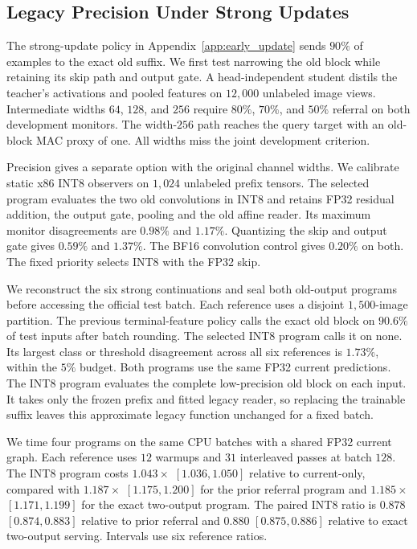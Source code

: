 \subsection{Legacy Precision Under Strong Updates}\label{app:legacy_precision}

The strong-update policy in Appendix~\ref{app:early_update} sends
$90\%$ of examples to the exact old suffix. We first test narrowing
the old block while retaining its skip path and output gate. A
head-independent student distils the teacher's activations and pooled
features on $12{,}000$ unlabeled image views. Intermediate widths
$64$, $128$, and $256$ require $80\%$, $70\%$, and $50\%$ referral on
both development monitors. The width-$256$ path reaches the query
target with an old-block MAC proxy of one. All widths miss the joint
development criterion.

Precision gives a separate option with the original channel widths.
We calibrate static x86 INT8 observers on $1{,}024$ unlabeled prefix
tensors. The selected program evaluates the two old convolutions in
INT8 and retains FP32 residual addition, the output gate, pooling and
the old affine reader. Its maximum monitor disagreements are $0.98\%$
and $1.17\%$. Quantizing the skip and output gate gives $0.59\%$ and
$1.37\%$. The BF16 convolution control gives $0.20\%$ on both.
The fixed priority selects INT8 with the FP32 skip.

We reconstruct the six strong continuations and seal both old-output
programs before accessing the official test batch. Each reference
uses a disjoint $1{,}500$-image partition. The previous terminal-feature
policy calls the exact old block on $90.6\%$ of test inputs after batch
rounding. The selected INT8 program calls it on none. Its largest
class or threshold disagreement across all six references is
$1.73\%$, within the $5\%$ budget. Both programs use the same FP32
current predictions. The INT8 program evaluates the complete
low-precision old block on each input. It takes only the frozen prefix
and fitted legacy reader, so replacing the trainable suffix leaves
this approximate legacy function unchanged for a fixed batch.

We time four programs on the same CPU batches with a shared FP32
current graph. Each reference uses $12$ warmups and $31$ interleaved
passes at batch $128$. The INT8 program costs $1.043\times$
$[1.036,1.050]$ relative to current-only, compared with $1.187\times$
$[1.175,1.200]$ for the prior referral program and $1.185\times$
$[1.171,1.199]$ for the exact two-output program. The paired INT8
ratio is $0.878$ $[0.874,0.883]$ relative to prior referral and
$0.880$ $[0.875,0.886]$ relative to exact two-output serving.
Intervals use six reference ratios.

